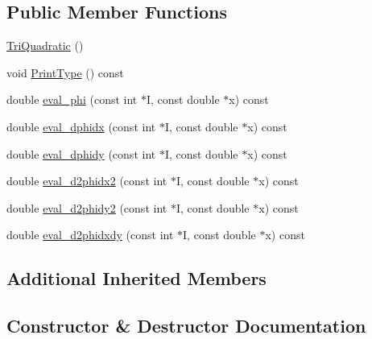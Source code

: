 \subsection*{Public Member Functions}
\begin{DoxyCompactItemize}
\item 
\mbox{\hyperlink{classfemus_1_1_tri_quadratic_ace63c1f751f9dd00ea1a882ec126c507}{Tri\+Quadratic}} ()
\item 
void \mbox{\hyperlink{classfemus_1_1_tri_quadratic_a608d29b44811f891b6b823198e957ae5}{Print\+Type}} () const
\item 
double \mbox{\hyperlink{classfemus_1_1_tri_quadratic_a9a3b005fa0c0c59ec95935edf9e10d7f}{eval\+\_\+phi}} (const int $\ast$I, const double $\ast$x) const
\item 
double \mbox{\hyperlink{classfemus_1_1_tri_quadratic_a98bad1aa37518ed91350f7628b45a380}{eval\+\_\+dphidx}} (const int $\ast$I, const double $\ast$x) const
\item 
double \mbox{\hyperlink{classfemus_1_1_tri_quadratic_ab7ac81f22dff08cb99f19414076561af}{eval\+\_\+dphidy}} (const int $\ast$I, const double $\ast$x) const
\item 
double \mbox{\hyperlink{classfemus_1_1_tri_quadratic_a6fb9f8965f2bbe889a1c67c9ee9ddc01}{eval\+\_\+d2phidx2}} (const int $\ast$I, const double $\ast$x) const
\item 
double \mbox{\hyperlink{classfemus_1_1_tri_quadratic_a37147196388fbe7fb347816f85c50e5e}{eval\+\_\+d2phidy2}} (const int $\ast$I, const double $\ast$x) const
\item 
double \mbox{\hyperlink{classfemus_1_1_tri_quadratic_a65fb374db41ce0bb2ade38e7e6af58a1}{eval\+\_\+d2phidxdy}} (const int $\ast$I, const double $\ast$x) const
\end{DoxyCompactItemize}
\subsection*{Additional Inherited Members}


\subsection{Constructor \& Destructor Documentation}
\mbox{\label{classfemus_1_1_tri_quadratic_ace63c1f751f9dd00ea1a882ec126c507}} 

